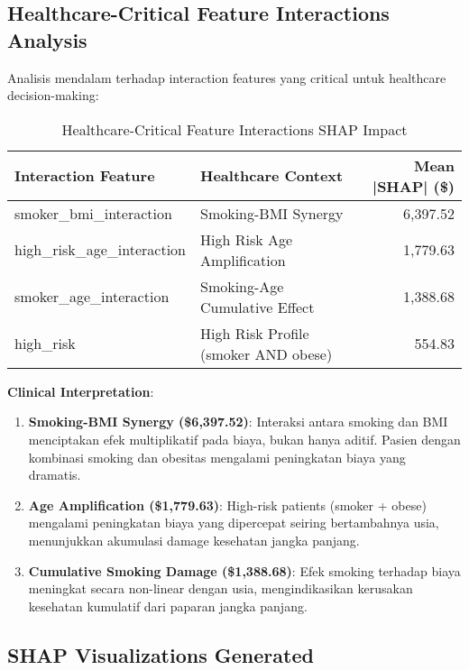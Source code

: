 \subsection{Healthcare-Critical Feature Interactions Analysis}
\label{subsec:shap-interactions}

Analisis mendalam terhadap interaction features yang critical untuk healthcare decision-making:

\begin{table}[H]
\centering
\caption{Healthcare-Critical Feature Interactions SHAP Impact}
\label{tab:shap-interactions}
\begin{tabular}{|l|l|r|}
\hline
\textbf{Interaction Feature} & \textbf{Healthcare Context} & \textbf{Mean |SHAP| (\$)} \\
\hline
smoker\_bmi\_interaction & Smoking-BMI Synergy & 6,397.52 \\
high\_risk\_age\_interaction & High Risk Age Amplification & 1,779.63 \\
smoker\_age\_interaction & Smoking-Age Cumulative Effect & 1,388.68 \\
high\_risk & High Risk Profile (smoker AND obese) & 554.83 \\
\hline
\end{tabular}
\end{table}

\textbf{Clinical Interpretation}:
\begin{enumerate}
    \item \textbf{Smoking-BMI Synergy (\$6,397.52)}: Interaksi antara smoking dan BMI menciptakan efek multiplikatif pada biaya, bukan hanya aditif. Pasien dengan kombinasi smoking dan obesitas mengalami peningkatan biaya yang dramatis.

    \item \textbf{Age Amplification (\$1,779.63)}: High-risk patients (smoker + obese) mengalami peningkatan biaya yang dipercepat seiring bertambahnya usia, menunjukkan akumulasi damage kesehatan jangka panjang.

    \item \textbf{Cumulative Smoking Damage (\$1,388.68)}: Efek smoking terhadap biaya meningkat secara non-linear dengan usia, mengindikasikan kerusakan kesehatan kumulatif dari paparan jangka panjang.
\end{enumerate}

\subsection{SHAP Visualizations Generated}
\label{subsec:shap-visualizations}


